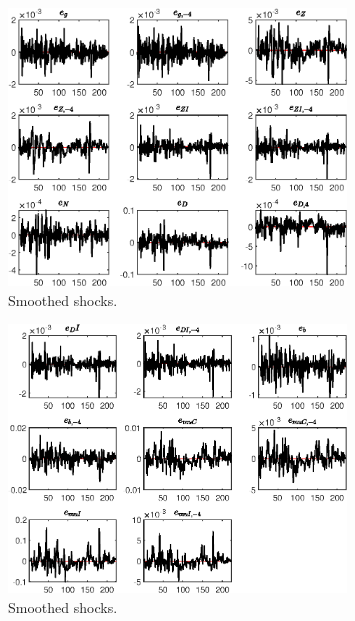  
\begin{figure}[H]
\centering 
\includegraphics[width=0.80\textwidth]{BRS_aggregate/graphs/BRS_aggregate_SmoothedShocks1}
\caption{Smoothed shocks.}\label{Fig:SmoothedShocks:1}
\end{figure}

\begin{figure}[H]
\centering 
\includegraphics[width=0.80\textwidth]{BRS_aggregate/graphs/BRS_aggregate_SmoothedShocks2}
\caption{Smoothed shocks.}\label{Fig:SmoothedShocks:2}
\end{figure}


